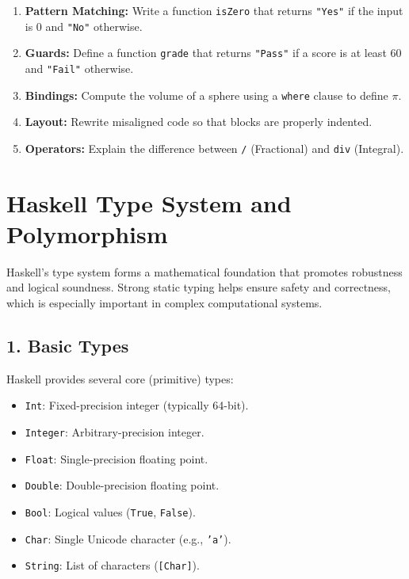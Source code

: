 \documentclass[12pt]{article}
\begin{document}
\begin{enumerate}
  \item \textbf{Pattern Matching:} Write a function \texttt{isZero} that returns \texttt{"Yes"} if the input is 0 and \texttt{"No"} otherwise.
  \item \textbf{Guards:} Define a function \texttt{grade} that returns \texttt{"Pass"} if a score is at least 60 and \texttt{"Fail"} otherwise.
  \item \textbf{Bindings:} Compute the volume of a sphere using a \texttt{where} clause to define $\pi$.
  \item \textbf{Layout:} Rewrite misaligned code so that blocks are properly indented.
  \item \textbf{Operators:} Explain the difference between \texttt{/} (Fractional) and \texttt{div} (Integral).
\end{enumerate}


\section{Haskell Type System and Polymorphism}

Haskell’s type system forms a mathematical foundation that promotes robustness and logical soundness. Strong static typing helps ensure safety and correctness, which is especially important in complex computational systems.

\subsection{1. Basic Types}

Haskell provides several core (primitive) types:

\begin{itemize}
  \item \texttt{Int}: Fixed-precision integer (typically 64-bit).
  \item \texttt{Integer}: Arbitrary-precision integer.
  \item \texttt{Float}: Single-precision floating point.
  \item \texttt{Double}: Double-precision floating point.
  \item \texttt{Bool}: Logical values (\texttt{True}, \texttt{False}).
  \item \texttt{Char}: Single Unicode character (e.g., \texttt{'a'}).
  \item \texttt{String}: List of characters (\texttt{[Char]}).
\end{itemize}
\end{document}
